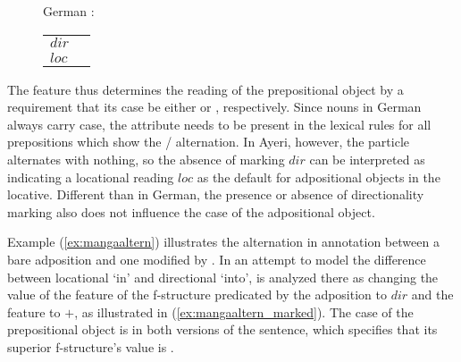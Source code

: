 \begin{figure}
\ex\label{ex:gercasealt}%
German \citep{butt2005}:\medskip\\
\begin{tabular}[t]{@{} l @{ $\implies$ } l}
\PSem{} $dir$ & \ups{\Obj{} \Case{}} \req{} \Acc{} \\
\PSem{} $loc$ & \ups{\Obj{} \Case{}} \req{} \Dat{} \\
\end{tabular}
\xe
\end{figure}

The \PSem{} feature thus determines the reading of the prepositional object by
a requirement that its case be either \Acc{} or \Dat{},
respectively. Since nouns in German always carry
case, the \PSem{} attribute needs to be present in the lexical
rules for all prepositions which show the \Acc{}/\Dat{} alternation.
In Ayeri, however, the particle  alternates with nothing, so the
absence of marking $dir$ can be interpreted as indicating a locational reading
$loc$ as the default for
adpositional objects in the locative. Different than in German,
the presence or absence of directionality marking also does not influence the
case of the adpositional object.

Example (\ref{ex:mangaaltern}) illustrates the alternation in annotation between
a bare adposition and one modified by . In an attempt to model
the difference between locational `in' and directional `into', 
is analyzed there as changing the value of the \PSem{} feature of the
f-structure predicated by the adposition to $dir$ and the \Tel{}
feature to $+$, as illustrated in (\ref{ex:mangaaltern_marked}). The
case of the prepositional object is \Loc{} in both versions of the sentence, which
specifies that its superior f-structure's \PCase{} value is .

